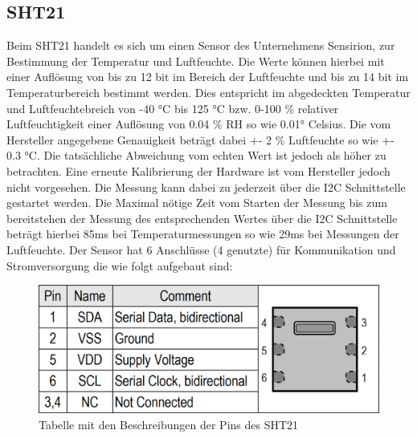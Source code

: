 \documentclass[]{article}
\begin{document}
		\subsection{SHT21}
		Beim SHT21 handelt es sich um einen Sensor des Unternehmens Sensirion, zur Bestimmung der Temperatur und Luftfeuchte.\cite{sht_datasheet} Die Werte können hierbei mit einer Auflösung von bis zu 12 bit im Bereich der Luftfeuchte und bis zu 14 bit im Temperaturbereich bestimmt werden. Dies entspricht im abgedeckten Temperatur und Luftfeuchtebreich von -40 °C bis 125 °C bzw. 0-100 \% relativer Luftfeuchtigkeit einer Auflösung von 0.04 \% RH so wie 0.01° Celsius. Die vom Hersteller angegebene Genauigkeit beträgt dabei +- 2 \% Luftfeuchte so wie +- 0.3 °C. Die tatsächliche Abweichung vom echten Wert ist jedoch als höher zu betrachten. Eine erneute Kalibrierung der Hardware ist vom Hersteller jedoch nicht vorgesehen. Die Messung kann dabei zu jederzeit über die I2C Schnittstelle gestartet werden. Die Maximal nötige Zeit vom Starten der Messung bis zum bereitstehen der Messung des entsprechenden Wertes über die I2C Schnittstelle beträgt hierbei 85ms bei Temperaturmessungen so wie 29ms bei Messungen der Luftfeuchte. Der Sensor hat 6 Anschlüsse (4 genutzte) für Kommunikation und Stromversorgung die wie folgt aufgebaut sind: 
		\begin{figure}[!h]
			\centering
			\includegraphics[scale=0.10]{images/sht_pintable}
			\caption{Tabelle mit den Beschreibungen der Pins des SHT21\cite{sht_datasheet}}
			\label{img:sht_pintable}
		\end{figure}
		
\end{document}
